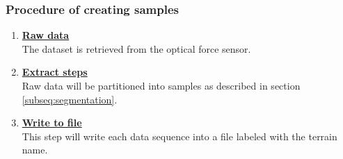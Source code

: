 \documentclass[USenglish]{ifimaster}  %
\begin{document}
\subsubsection{Procedure of creating samples} \label{sub:createsamples}
	\begin{enumerate}
		\item \textbf{\underline{Raw data}}
		\\
		The dataset is retrieved from the optical force sensor.
		
		\item \textbf{\underline{Extract steps}}
		\\
		Raw data will be partitioned into samples as described in section \ref{subseq:segmentation}.
		
		\item \textbf{\underline{Write to file}}
		\\
		This step will write each data sequence into a file labeled with the terrain name.
		
		
\end{enumerate}
\clearpage
\end{document}
